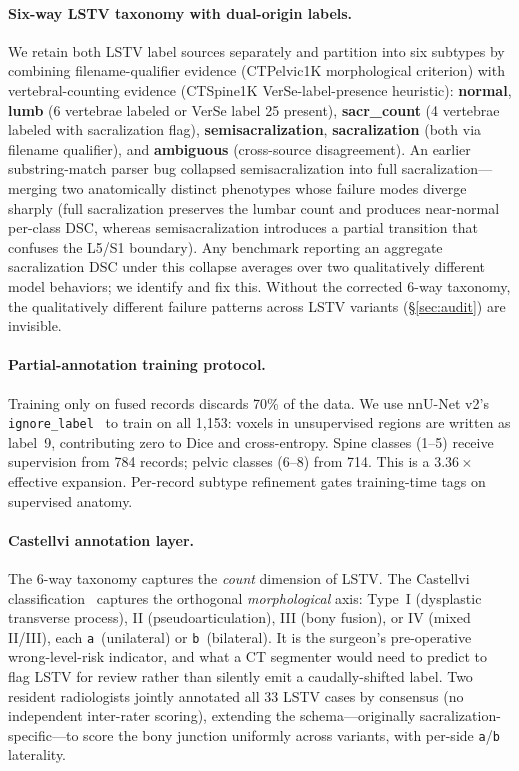 \documentclass{article}
\newcommand{\VerSe}{VerSe}
\begin{document}
\paragraph{Six-way LSTV taxonomy with dual-origin
labels.} We retain both LSTV label sources separately and
partition into six subtypes by combining filename-qualifier
evidence (CTPelvic1K morphological criterion) with
vertebral-counting evidence (CTSpine1K
\VerSe{}-label-presence heuristic):
\textbf{normal}, \textbf{lumb} (6 vertebrae labeled or
\VerSe{} label 25 present), \textbf{sacr\_count} (4
vertebrae labeled with sacralization flag),
\textbf{semisacralization}, \textbf{sacralization}
(both via filename qualifier), and \textbf{ambiguous}
(cross-source disagreement). An earlier substring-match
parser bug collapsed semisacralization into full
sacralization---merging two anatomically distinct
phenotypes whose failure modes diverge sharply (full
sacralization preserves the lumbar count and produces
near-normal per-class DSC, whereas semisacralization
introduces a partial transition that confuses the L5/S1
boundary). Any benchmark reporting an aggregate
sacralization DSC under this collapse averages over
two qualitatively different model behaviors; we identify
and fix this. Without the corrected 6-way taxonomy, the
qualitatively different failure patterns across LSTV
variants (\S\ref{sec:audit}) are invisible.

\paragraph{Partial-annotation training protocol.}
\label{sec:partial}
Training only on fused records discards 70\% of the data.
We use nnU-Net v2's
\texttt{ignore\_label}~\citep{Isensee2024Nnu-netSegmentation}
to train on all 1{,}153: voxels in unsupervised regions are
written as label~9, contributing zero to Dice and
cross-entropy. Spine classes (1--5) receive supervision
from 784 records; pelvic classes (6--8) from 714. This is a
$3.36\times$ effective expansion. Per-record subtype
refinement gates training-time tags on supervised anatomy.

\paragraph{Castellvi annotation layer.}
\label{sec:castellvi}
The 6-way taxonomy captures the \emph{count} dimension of
LSTV. The Castellvi
classification~\citep{Castellvi1984LumbosacralDefects}
captures the orthogonal \emph{morphological} axis:
Type~I (dysplastic transverse process), II
(pseudoarticulation), III (bony fusion), or IV (mixed
II/III), each \texttt{a}~(unilateral) or
\texttt{b}~(bilateral). It is the surgeon's
pre-operative wrong-level-risk indicator, and what a CT
segmenter would need to predict to flag LSTV for review
rather than silently emit a caudally-shifted label.
Two resident radiologists jointly annotated all 33 LSTV
cases by consensus (no independent inter-rater scoring),
extending the schema---originally
sacralization-specific---to score the bony junction
uniformly across variants, with per-side
\texttt{a}/\texttt{b} laterality.
\end{document}
